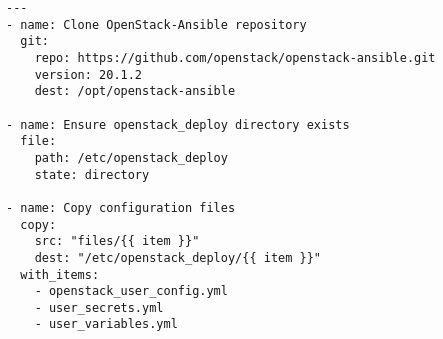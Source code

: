  \label{ansible-setup}

\begin{verbatim}
---
- name: Clone OpenStack-Ansible repository
  git:
    repo: https://github.com/openstack/openstack-ansible.git
    version: 20.1.2
    dest: /opt/openstack-ansible

- name: Ensure openstack_deploy directory exists
  file:
    path: /etc/openstack_deploy
    state: directory

- name: Copy configuration files
  copy:
    src: "files/{{ item }}"
    dest: "/etc/openstack_deploy/{{ item }}"
  with_items:
    - openstack_user_config.yml
    - user_secrets.yml
    - user_variables.yml
\end{verbatim}

